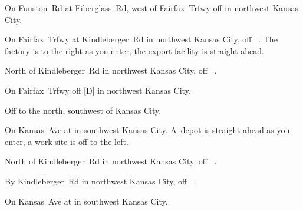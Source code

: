 

\begin{LocationList}

On Funston~Rd at Fiberglass~Rd, west of Fairfax~Trfwy off   in northwest Kansas City.

On Fairfax~Trfwy at Kindleberger~Rd in northwest Kansas City, off~ .
The factory is to the right as you enter, the export facility is straight ahead.

North of Kindleberger~Rd in northwest Kansas City, off~ .

On Fairfax~Trfwy off  [D] in northwest Kansas City.

Off   to the north, southwest of Kansas City.

On  Kansas~Ave at   in southwest Kansas City.
A~depot is straight ahead as you enter, a work site is off to the left.

North of Kindleberger~Rd in northwest Kansas City, off~ .

\Location{\RecruitmentAgency \Recruitment}
By Kindleberger~Rd in northwest Kansas City, off~ .

\Location{\TruckStop \Gas \Rest \Service}
On  Kansas~Ave at   in southwest Kansas City.

\end{LocationList}
